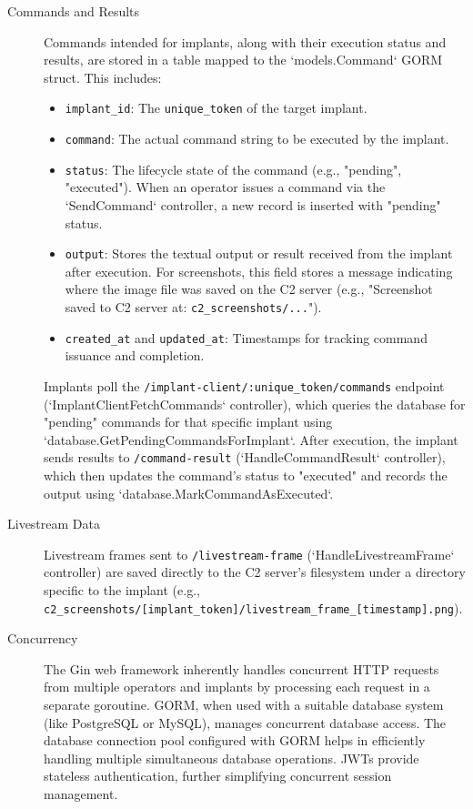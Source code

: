 \begin{description}
    \item[Commands and Results] Commands intended for implants, along with their execution status and results, are stored in a table mapped to the `models.Command` GORM struct. This includes:
        \begin{itemize}
            \item \texttt{implant\_id}: The \texttt{unique\_token} of the target implant.
            \item \texttt{command}: The actual command string to be executed by the implant.
            \item \texttt{status}: The lifecycle state of the command (e.g., "pending", "executed"). When an operator issues a command via the `SendCommand` controller, a new record is inserted with "pending" status.
            \item \texttt{output}: Stores the textual output or result received from the implant after execution. For screenshots, this field stores a message indicating where the image file was saved on the C2 server (e.g., "Screenshot saved to C2 server at: \texttt{c2\_screenshots/...}").
            \item \texttt{created\_at} and \texttt{updated\_at}: Timestamps for tracking command issuance and completion.
        \end{itemize}
        Implants poll the \texttt{/implant-client/:unique\_token/commands} endpoint (`ImplantClientFetchCommands` controller), which queries the database for "pending" commands for that specific implant using `database.GetPendingCommandsForImplant`. After execution, the implant sends results to \texttt{/command-result} (`HandleCommandResult` controller), which then updates the command's status to "executed" and records the output using `database.MarkCommandAsExecuted`.

    \item[Livestream Data] Livestream frames sent to \texttt{/livestream-frame} (`HandleLivestreamFrame` controller) are saved directly to the C2 server's filesystem under a directory specific to the implant (e.g., \texttt{c2\_screenshots/[implant\_token]/livestream\_frame\_[timestamp].png}).

    \item[Concurrency] The Gin web framework inherently handles concurrent HTTP requests from multiple operators and implants by processing each request in a separate goroutine. GORM, when used with a suitable database system (like PostgreSQL or MySQL), manages concurrent database access. The database connection pool configured with GORM helps in efficiently handling multiple simultaneous database operations. JWTs provide stateless authentication, further simplifying concurrent session management.
\end{description}

